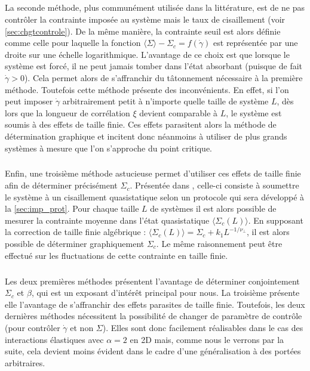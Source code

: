 \subparagraph{}La seconde méthode, plus communément utilisée dans la littérature, est de ne pas contrôler la contrainte imposée au système mais le taux de cisaillement (voir \autoref{sec:chgtcontrole}). De la même manière, la contrainte seuil est alors définie comme celle pour laquelle la fonction $\langle \Sigma \rangle - \Sigma_c = f(\dot{\gamma})$ est représentée par une droite sur une échelle logarithmique. L'avantage de ce choix est que lorsque le système est forcé, il ne peut jamais tomber dans l'état absorbant (puisque de fait $\dot{\gamma}>0$). Cela permet alors de s'affranchir du tâtonnement nécessaire à la première méthode. Toutefois cette méthode présente des inconvénients. En effet, si l'on peut imposer $\dot{\gamma}$ arbitrairement petit à n'importe quelle taille de système $L$, dès lors que la longueur de corrélation $\xi$ devient comparable à $L$, le système est soumis à des effets de taille finie. Ces effets parasitent alors la méthode de détermination graphique et incitent donc néanmoins à utiliser de plus grands systèmes à mesure que l'on s'approche du point critique.

\subparagraph{}Enfin, une troisième méthode astucieuse permet d'utiliser ces effets de taille finie afin de déterminer précisément $\Sigma_c$. Présentée dans \cite{lin_scaling_2014}, celle-ci consiste à soumettre le système à un cisaillement quasistatique selon un protocole qui sera développé à la \autoref{sec:imp_prot}. Pour chaque taille $L$ de systèmes il est alors possible de mesurer la contrainte moyenne dans l'état quasistatique $\langle\Sigma_c (L)\rangle$. En supposant la correction de taille finie algébrique : $\langle\Sigma_c (L)\rangle = \Sigma_c+k_1 L^{-1/\nu_\perp}$, il est alors possible de déterminer graphiquement $\Sigma_c$. Le même raisonnement peut être effectué sur les fluctuations de cette contrainte en taille finie.

\subparagraph{}Les deux premières méthodes présentent l'avantage de déterminer conjointement $\Sigma_c$ et $\beta$, qui est un exposant d'intérêt principal pour nous. La troisième présente elle l'avantage de s'affranchir des effets parasites de taille finie. Toutefois, les deux dernières méthodes nécessitent la possibilité de changer de paramètre de contrôle (pour contrôler $\dot{\gamma}$ et non $\Sigma$). Elles sont donc facilement réalisables dans le cas des interactions élastiques avec $\alpha = 2$ en 2D mais, comme nous le verrons par la suite, cela devient moins évident dans le cadre d'une généralisation à des portées arbitraires. 

